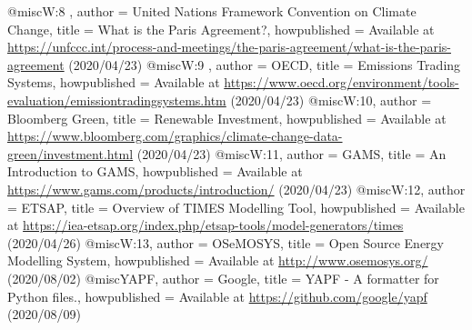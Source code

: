 @misc{W:8 ,
    author = {United Nations Framework Convention on Climate Change},
    title = {What is the Paris Agreement?},
    howpublished = {Available at \url{https://unfccc.int/process-and-meetings/the-paris-agreement/what-is-the-paris-agreement} (2020/04/23)}
}
@misc{W:9 ,
    author = {OECD},
    title = {Emissions Trading Systems},
    howpublished = {Available at \url{https://www.oecd.org/environment/tools-evaluation/emissiontradingsystems.htm} (2020/04/23)}
}
@misc{W:10,
    author = {Bloomberg Green},
    title = {Renewable Investment},
    howpublished = {Available at \url{https://www.bloomberg.com/graphics/climate-change-data-green/investment.html} (2020/04/23)}
}
@misc{W:11,
    author = {GAMS},
    title = {An Introduction to GAMS},
    howpublished = {Available at \url{https://www.gams.com/products/introduction/} (2020/04/23)}
}
@misc{W:12,
    author = {ETSAP},
    title = {Overview of TIMES Modelling Tool},
    howpublished = {Available at \url{https://iea-etsap.org/index.php/etsap-tools/model-generators/times} (2020/04/26)}
}
@misc{W:13,
    author = {OSeMOSYS},
    title = {Open Source Energy Modelling System},
    howpublished = {Available at \url{http://www.osemosys.org/} (2020/08/02)}
}
@misc{YAPF,
    author = {Google},
    title = {YAPF - A formatter for Python files.},
    howpublished = {Available at \url{https://github.com/google/yapf} (2020/08/09)}
}

